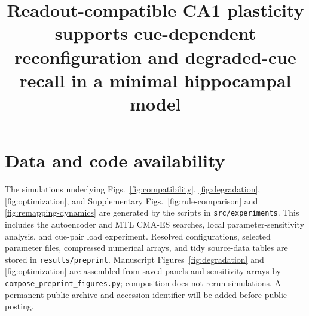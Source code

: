 \documentclass[11pt]{article}
\title{Readout-compatible CA1 plasticity supports cue-dependent reconfiguration and degraded-cue recall in a minimal hippocampal model}
\author{}
\date{}
\begin{document}
\maketitle







\section*{Data and code availability}

The simulations underlying Figs.~\ref{fig:compatibility},
\ref{fig:degradation}, \ref{fig:optimization}, and Supplementary Figs.~\ref{fig:rule-comparison} and
\ref{fig:remapping-dynamics} are generated by the scripts in
\texttt{src/experiments}. This includes the autoencoder and MTL CMA-ES
searches, local parameter-sensitivity analysis, and cue-pair load experiment.
Resolved configurations, selected parameter files, compressed numerical
arrays, and tidy source-data tables are stored in
\texttt{results/preprint}. Manuscript Figures~\ref{fig:degradation} and
\ref{fig:optimization} are assembled from saved panels and sensitivity arrays
by \texttt{compose\_preprint\_figures.py}; composition does not rerun simulations.
A permanent public archive and accession identifier
will be added before public posting.

\begingroup
\small


\endgroup


\end{document}
